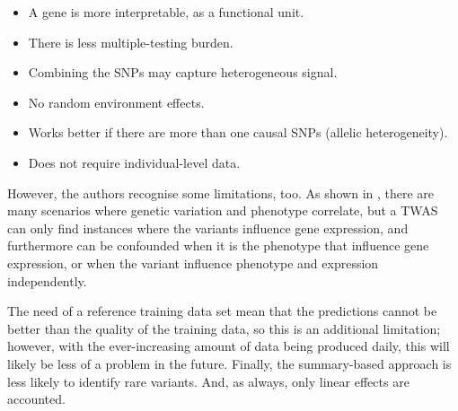 \documentclass[../main.tex]{subfiles}
\begin{document}
\begin{itemize}
	\item A gene is more interpretable, as a functional unit.
	\item There is less multiple-testing burden.
	\item Combining the SNPs may capture heterogeneous signal.
	\item No random environment effects.
	\item Works better if there are more than one causal SNPs (allelic 
heterogeneity).
	\item Does not require individual-level data.
\end{itemize}

However, the authors recognise some limitations, too. As shown in 
, there are many scenarios where genetic variation 
and phenotype correlate, but a TWAS can only find instances where the 
variants influence gene expression, and furthermore can be confounded 
when it is the phenotype that influence gene expression, or when the 
variant influence phenotype and expression independently.

The need of a reference training data set mean that the predictions 
cannot be better than the quality of the training data, so this is an 
additional limitation; however, with the ever-increasing amount of data 
being produced daily, this will likely be less of a problem in the 
future. Finally, the summary-based approach is less likely to identify 
rare variants. And, as always, only linear effects are accounted.
\end{document}
